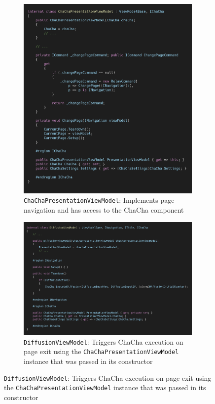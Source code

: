 \begin{figure}
\centering
\caption[ChaCha diffusion execution]{Triggering ChaCha execution with values entered in Diffusion page}
\label{fig:mvvm.chachatrigger}
\begin{subfigure}[t]{0.5\textwidth}
\label{fig:mvvm.chachapresentationviewmodel}
\centering
\includegraphics[width=0.99\textwidth]{figures/code/mvvm-arch/chachaPresentationViewModel.png}
\caption{\texttt{ChaChaPresentationViewModel}: Implements page navigation and has access to the ChaCha component}
\end{subfigure}%
\begin{subfigure}[t]{0.5\textwidth}
\label{fig:mvvm.viewmodelbase}
\centering
\includegraphics[width=0.99\textwidth]{figures/code/mvvm-arch/diffusionViewModel.png}
\caption{\texttt{DiffusionViewModel}: Triggers ChaCha execution on page exit using the \texttt{ChaChaPresentationViewModel} instance that was passed in its constructor}
\end{subfigure}
\end{figure}

